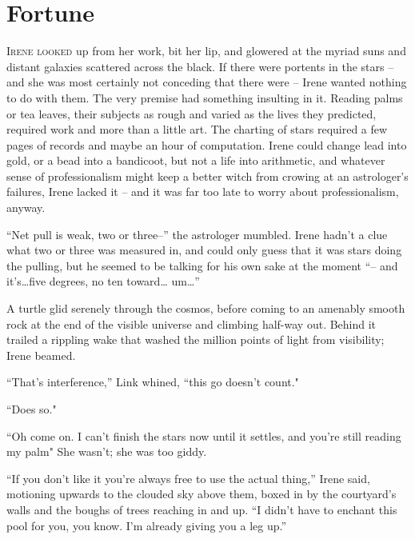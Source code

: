 \documentclass[../FGP.tex]{subfiles}
\begin{document}
\section{Fortune}
\begin{fragment}
\noindent \lettrine[lines=3,loversize=0.039]{I}{rene looked} up from her work, bit her lip, and glowered at the myriad suns and distant galaxies scattered across the black. If there were portents in the stars -- and she was most certainly not conceding that there were -- Irene wanted nothing to do with them. The very premise had something insulting in it. Reading palms or tea leaves, their subjects as rough and varied as the lives they predicted, required work and more than a little art. The charting of stars required a few pages of records and maybe an hour of computation. Irene could change lead into gold, or a bead into a bandicoot, but not a life into arithmetic, and whatever sense of professionalism might keep a better witch from crowing at an astrologer's failures, Irene lacked it -- and it was far too late to worry about professionalism, anyway.

``Net pull is weak, two or three--'' the astrologer mumbled. Irene hadn't a clue what two or three was measured in, and could only guess that it was stars doing the pulling, but he seemed to be talking for his own sake at the moment ``-- and it's\ldots five degrees, no ten toward{\ldots} um{\ldots}''

A turtle glid serenely through the cosmos, before coming to an amenably smooth rock at the end of the visible universe and climbing half-way out. Behind it trailed a rippling wake that washed the million points of light from visibility; Irene beamed.

``That's interference,'' Link whined, ``this go doesn't count."  

``Does so." 

``Oh come on. I can't finish the stars now until it settles, and you're still reading my palm" She wasn't; she was too giddy.

``If you don't like it you're always free to use the actual thing,'' Irene said, motioning upwards to the clouded sky above them, boxed in by the courtyard's walls and the boughs of trees reaching in and up. ``I didn't have to enchant this pool for you, you know. I'm already giving you a leg up.''


\end{fragment}
\end{document}

